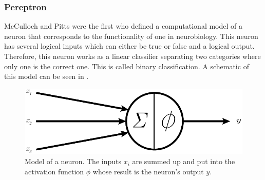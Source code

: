 \subsubsection{Pereptron}
\label{sec:mlp-theorie}
McCulloch and Pitts\cite{McCulloch1988} were the first who defined a computational model of a neuron that corresponds to the functionality of one in neurobiology.
This neuron has several logical inputs which can either be true or false and a logical output.
Therefore, this neuron works as a linear classifier separating two categories where only one is the correct one.
This is called binary classification.
A schematic of this model can be seen in .
\begin{figure}
	\centering
	\includegraphics{images/neuron.pdf}
	\caption[Model of a Neuron]{Model of a neuron. The inputs $x_i$ are summed up and put into the activation function $\phi$ whose result is the neuron's output $y$.}
	\label{fig:neuron}
\end{figure}

